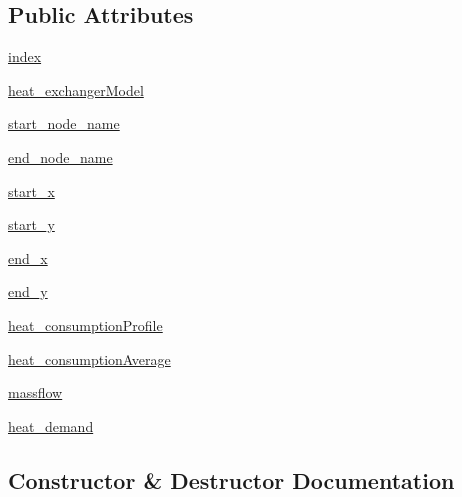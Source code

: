 \subsection*{Public Attributes}
\begin{DoxyCompactItemize}
\item 
\hyperlink{class_consumer_1_1_consumer_acada64c32e228cf283b639c05dca48da}{index}
\item 
\hyperlink{class_consumer_1_1_consumer_abecc1b73487aa5b5e7d01fa7df93194d}{heat\+\_\+exchanger\+Model}
\item 
\hyperlink{class_consumer_1_1_consumer_a7260abfc8da45b0de6dd3907e9f1d0c7}{start\+\_\+node\+\_\+name}
\item 
\hyperlink{class_consumer_1_1_consumer_ae5d2f6ddf475f4c856ba8953805f27d3}{end\+\_\+node\+\_\+name}
\item 
\hyperlink{class_consumer_1_1_consumer_a2b4e4c75066ac9e44f1c878608f5b8d6}{start\+\_\+x}
\item 
\hyperlink{class_consumer_1_1_consumer_a3e90aa467f71be63160bfa466e1c9d2b}{start\+\_\+y}
\item 
\hyperlink{class_consumer_1_1_consumer_abd46737be61b12a63808366b4c6611a3}{end\+\_\+x}
\item 
\hyperlink{class_consumer_1_1_consumer_a481d7ab91da5f55be5ba918adda5af36}{end\+\_\+y}
\item 
\hyperlink{class_consumer_1_1_consumer_a5154dfab3d485a066598b89122d38e26}{heat\+\_\+consumption\+Profile}
\item 
\hyperlink{class_consumer_1_1_consumer_aba14cee2b8276b8ae93a69a61015d5b5}{heat\+\_\+consumption\+Average}
\item 
\hyperlink{class_consumer_1_1_consumer_aad24a3c3e760d1c44fa98febaabeaf22}{massflow}
\item 
\hyperlink{class_consumer_1_1_consumer_a2b741d0a3820dadb39ebe0bcc13d39d9}{heat\+\_\+demand}
\end{DoxyCompactItemize}


\subsection{Constructor \& Destructor Documentation}
\mbox{\label{class_consumer_1_1_consumer_ac4c06a6de40e3415a3e11460a8430be3}} 

